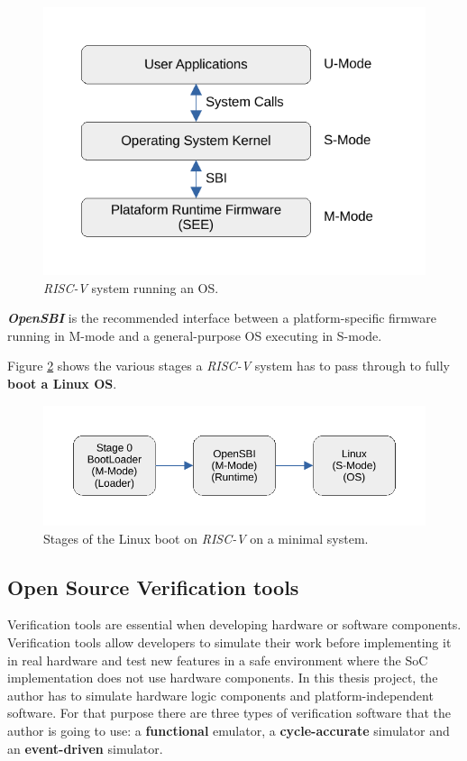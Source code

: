 \begin{figure}[!h]
    \centering
    \includegraphics[width=0.8\linewidth]{../images/riscv_sbi.pdf}
    \caption{\textit{RISC-V} system running an OS.}
    \label{fig:riscv_sbi}
\end{figure}

\textbf{\textit{OpenSBI}} is the recommended interface between a platform-specific firmware running in M-mode and a general-purpose OS executing in S-mode.

Figure \ref{fig:linux_boot_flow} shows the various stages a \textit{RISC-V} system has to pass through to fully \textbf{boot a Linux OS}.

\begin{figure}[!h]
  \centering
  \includegraphics[width=0.9\linewidth]{../images/linux_boot_flow.pdf}
  \caption{Stages of the Linux boot on \textit{RISC-V} on a minimal system.}
  \label{fig:linux_boot_flow}
\end{figure}

\subsection{Open Source Verification tools}
Verification tools are essential when developing hardware or software components. Verification tools allow developers to simulate their work before implementing it in real hardware and test new features in a safe environment where the SoC implementation does not use hardware components. In this thesis project, the author has to simulate hardware logic components and platform-independent software. For that purpose there are three types of verification software that the author is going to use: a \textbf{functional} emulator, a \textbf{cycle-accurate} simulator and an \textbf{event-driven} simulator.

